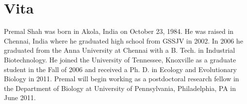\chapter*{Vita} \label{ch:vita}
Premal Shah was born in Akola, India on October 23, 1984.
He was raised in Chennai, India where he graduated high school from GSSJV in 2002. 
In 2006 he graduated from the Anna University at Chennai with a B. Tech. in Industrial Biotechnology. 
He joined the University of Tennessee, Knoxville as a graduate student in the Fall of 2006 and received a Ph. D. in Ecology and Evolutionary Biology in 2011.
Premal will begin working as a postdoctoral research fellow in the Department of Biology at University of Pennsylvania, Philadelphia, PA in June 2011.